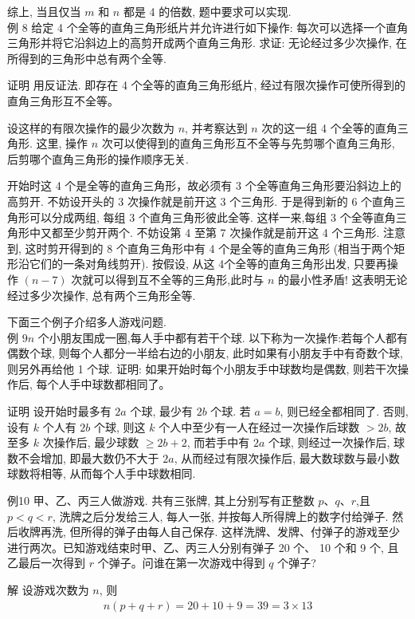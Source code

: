 \documentclass[10pt]{article}
\begin{document}
综上, 当且仅当 $m$ 和 $n$ 都是 4 的倍数, 题中要求可以实现.\\
例 8 给定 4 个全等的直角三角形纸片并允许进行如下操作: 每次可以选择一个直角三角形并将它沿斜边上的高剪开成两个直角三角形. 求证: 无论经过多少次操作, 在所得到的三角形中总有两个全等.

证明 用反证法. 即存在 4 个全等的直角三角形纸片, 经过有限次操作可使所得到的直角三角形互不全等。

设这样的有限次操作的最少次数为 $n$, 并考察达到 $n$ 次的这一组 4 个全等的直角三角形. 这里, 操作 $n$ 次可以使得到的直角三角形互不全等与先剪哪个直角三角形, 后剪哪个直角三角形的操作顺序无关.

开始时这 4 个是全等的直角三角形，故必须有 3 个全等直角三角形要沿斜边上的高剪开. 不妨设开头的 3 次操作就是前开这 3 个三角形. 于是得到新的 6 个直角三角形可以分成两组, 每组 3 个直角三角形彼此全等. 这样一来,每组 3 个全等直角三角形中又都至少剪开两个. 不妨设第 4 至第 7 次操作就是前开这 4 个三角形. 注意到, 这时剪开得到的 8 个直角三角形中有 4 个是全等的直角三角形 (相当于两个矩形沿它们的一条对角线剪开). 按假设, 从这 4个全等的直角三角形出发, 只要再操作 $(n-7)$ 次就可以得到互不全等的三角形,此时与 $n$ 的最小性矛盾! 这表明无论经过多少次操作, 总有两个三角形全等.

下面三个例子介绍多人游戏问题.\\
例 $9 n$ 个小朋友围成一圈,每人手中都有若干个球. 以下称为一次操作:若每个人都有偶数个球, 则每个人都分一半给右边的小朋友, 此时如果有小朋友手中有奇数个球, 则另外再给他 1 个球. 证明: 如果开始时每个小朋友手中球数均是偶数, 则若干次操作后, 每个人手中球数都相同了。

证明 设开始时最多有 $2 a$ 个球, 最少有 $2 b$ 个球. 若 $a=b$, 则已经全都相同了. 否则, 设有 $k$ 个人有 $2 b$ 个球, 则这 $k$ 个人中至少有一人在经过一次操作后球数 $>2 b$, 故至多 $k$ 次操作后, 最少球数 $\geqslant 2 b+2$, 而若手中有 $2 a$ 个球, 则经过一次操作后, 球数不会增加, 即最大数仍不大于 $2 a$, 从而经过有限次操作后, 最大数球数与最小数球数将相等, 从而每个人手中球数相同.

例10 甲、乙、丙三人做游戏. 共有三张牌, 其上分别写有正整数 $p 、 q 、 r$,且 $p<q<r$, 洗牌之后分发给三人, 每人一张, 并按每人所得牌上的数字付给弹子. 然后收牌再洗, 但所得的弹子由每人自己保存. 这样洗牌、发牌、付弹子的游戏至少进行两次。已知游戏结束时甲、乙、丙三人分别有弹子 20 个、 10 个和 9 个, 且乙最后一次得到 $r$ 个弹子。问谁在第一次游戏中得到 $q$ 个弹子?

解 设游戏次数为 $n$, 则\\
\begin{align*}
n(p+q+r)=20+10+9=39=3 \times 13
\end{align*}
\end{document}
